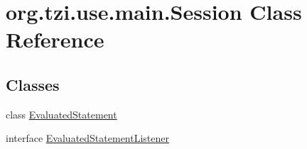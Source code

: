 \hypertarget{classorg_1_1tzi_1_1use_1_1main_1_1_session}{\section{org.\-tzi.\-use.\-main.\-Session Class Reference}
\label{classorg_1_1tzi_1_1use_1_1main_1_1_session}
}
\subsection*{Classes}
\begin{DoxyCompactItemize}
\item 
class \hyperlink{classorg_1_1tzi_1_1use_1_1main_1_1_session_1_1_evaluated_statement}{Evaluated\-Statement}
\item 
interface \hyperlink{interfaceorg_1_1tzi_1_1use_1_1main_1_1_session_1_1_evaluated_statement_listener}{Evaluated\-Statement\-Listener}
\end{DoxyCompactItemize}
